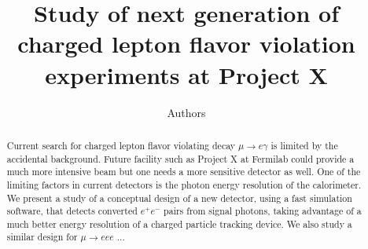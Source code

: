 \documentclass[12pt]{article}
\begin{document}

\title{Study of next generation of charged lepton flavor violation experiments at Project X}

\author{Authors}

\maketitle

\begin{abstract}
Current search for charged lepton flavor violating decay $\mu\to e \gamma$ is 
limited by the accidental background. Future facility such as Project X at 
Fermilab could provide a much more intensive beam but one needs a more 
sensitive detector as well. One of the limiting factors in current detectors
is the photon energy resolution of the calorimeter. We present a study of a
conceptual design of a new detector, using a fast simulation software, that
detects converted $e^+e^-$ pairs from signal photons, taking advantage of a much
better energy resolution of a charged particle tracking device. We also study
a similar design for $\mu\to eee$ ...
\end{abstract}








\end{document}
